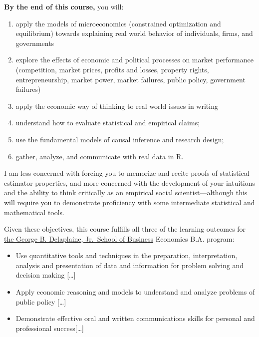 \documentclass{article}
\providecommand{\tightlist}{%
  \setlength{\itemsep}{0pt}\setlength{\parskip}{0pt}}
\begin{document}
\textbf{By the end of this course,} you will:

\begin{enumerate}
\def\labelenumi{\arabic{enumi}.}
\item
  apply the models of microeconomics (constrained optimization and
  equilibrium) towards explaining real world behavior of individuals,
  firms, and governments
\item
  explore the effects of economic and political processes on market
  performance (competition, market prices, profits and losses, property
  rights, entrepreneurship, market power, market failures, public
  policy, government failures)
\item
  apply the economic way of thinking to real world issues in writing
\item
  understand how to evaluate statistical and empirical claims;
\item
  use the fundamental models of causal inference and research design;
\item
  gather, analyze, and communicate with real data in R.
\end{enumerate}

I am less concerned with forcing you to memorize and recite proofs of
statistical estimator properties, and more concerned with the
development of your intuitions and the ability to think critically as an
empirical social scientist---although this will require you to
demonstrate proficiency with some intermediate statistical and
mathematical tools.

Given these objectives, this course fulfills all three of the learning
outcomes for
\href{https://www.hood.edu/academics/departments/george-b-delaplaine-jr-school-business/student-learning-outcomes}{the
George B. Delaplaine, Jr.~School of Business} Economics B.A. program:

\begin{itemize}
\tightlist
\item
  Use quantitative tools and techniques in the preparation,
  interpretation, analysis and presentation of data and information for
  problem solving and decision making {[}\ldots{]}
\item
  Apply economic reasoning and models to understand and analyze problems
  of public policy {[}\ldots{]}
\item
  Demonstrate effective oral and written communications skills for
  personal and professional success{[}\ldots{]}
\end{itemize}
\end{document}
